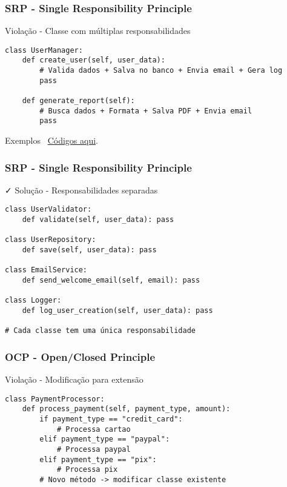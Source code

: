 \documentclass[aspectratio=169]{beamer}
\begin{document}
\begin{frame}[fragile]
\frametitle{SRP - Single Responsibility Principle}
\begin{block}{\textcolor{cleanred}{\faTimes} Violação - Classe com múltiplas responsabilidades}
\scriptsize
\begin{lstlisting}
class UserManager:
    def create_user(self, user_data):
        # Valida dados + Salva no banco + Envia email + Gera log
        pass
        
    def generate_report(self):
        # Busca dados + Formata + Salva PDF + Envia email
        pass
\end{lstlisting}
\end{block}

\vspace{0.3cm}
\begin{alertblock}{Exemplos}
\footnotesize
\faGithub \, \href{https://github.com/fmarquesfilho/bpp-2025-2/blob/main/src/s4/}{Códigos aqui}.
\end{alertblock}
\end{frame}

\begin{frame}[fragile]
\frametitle{SRP - Single Responsibility Principle}
\begin{block}{\textcolor{cleangreen}{\faCheck} Solução - Responsabilidades separadas}
\scriptsize
\begin{lstlisting}
class UserValidator:
    def validate(self, user_data): pass

class UserRepository:
    def save(self, user_data): pass

class EmailService:
    def send_welcome_email(self, email): pass

class Logger:
    def log_user_creation(self, user_data): pass

# Cada classe tem uma única responsabilidade
\end{lstlisting}
\end{block}
\end{frame}

\begin{frame}[fragile]
\frametitle{OCP - Open/Closed Principle}
\begin{block}{\textcolor{cleanred}{\faTimes} Violação - Modificação para extensão}
\scriptsize
\begin{lstlisting}
class PaymentProcessor:
    def process_payment(self, payment_type, amount):
        if payment_type == "credit_card":
            # Processa cartao
        elif payment_type == "paypal":
            # Processa paypal
        elif payment_type == "pix":
            # Processa pix
        # Novo método -> modificar classe existente
\end{lstlisting}
\end{block}
\end{frame}
\end{document}
